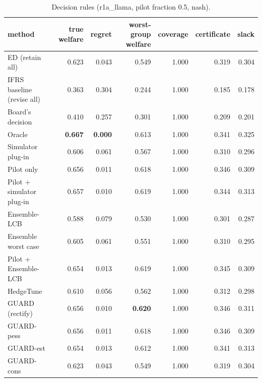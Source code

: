 \begin{table}[t]
\centering
\small
\begin{tabular}{lrrrrrr}
\toprule
method & true welfare & regret & worst-group welfare & coverage & certificate & slack \\
\midrule
ED (retain all) & 0.623 & 0.043 & 0.549 & 1.000 & 0.319 & 0.304 \\
IFRS baseline (revise all) & 0.363 & 0.304 & 0.244 & 1.000 & 0.185 & 0.178 \\
Board's decision & 0.410 & 0.257 & 0.301 & 1.000 & 0.209 & 0.201 \\
Oracle & \textbf{0.667} & \textbf{0.000} & 0.613 & 1.000 & 0.341 & 0.325 \\
Simulator plug-in & 0.606 & 0.061 & 0.567 & 1.000 & 0.310 & 0.296 \\
Pilot only & 0.656 & 0.011 & 0.618 & 1.000 & 0.346 & 0.309 \\
Pilot + simulator plug-in & 0.657 & 0.010 & 0.619 & 1.000 & 0.344 & 0.313 \\
Ensemble-LCB & 0.588 & 0.079 & 0.530 & 1.000 & 0.301 & 0.287 \\
Ensemble worst case & 0.605 & 0.061 & 0.551 & 1.000 & 0.310 & 0.295 \\
Pilot + Ensemble-LCB & 0.654 & 0.013 & 0.619 & 1.000 & 0.345 & 0.309 \\
HedgeTune & 0.610 & 0.056 & 0.562 & 1.000 & 0.312 & 0.298 \\
GUARD (rectify) & 0.656 & 0.010 & \textbf{0.620} & 1.000 & 0.346 & 0.311 \\
GUARD-pess & 0.656 & 0.011 & 0.618 & 1.000 & 0.346 & 0.309 \\
GUARD-est & 0.654 & 0.013 & 0.612 & 1.000 & 0.341 & 0.313 \\
GUARD-cons & 0.623 & 0.043 & 0.549 & 1.000 & 0.319 & 0.304 \\
\bottomrule
\end{tabular}
\caption{Decision rules (r1a\_llama, pilot fraction 0.5, nash).}
\label{tab:methods-nash}
\end{table}
